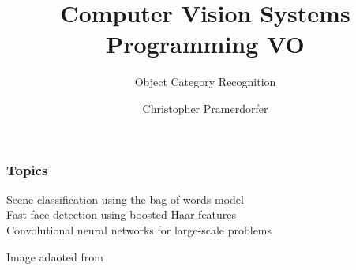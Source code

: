 \documentclass[xetex,professionalfont]{beamer}
\title{Computer Vision Systems Programming VO}
\subtitle{Object Category Recognition}
\author{Christopher Pramerdorfer}
\institute{Computer Vision Lab, Vienna University of Technology}
\begin{document}

\begin{frame}
\maketitle
\end{frame}


\begin{frame}
\frametitle{Topics}

Scene classification using the bag of words model \\
Fast face detection using boosted Haar features \\
Convolutional neural networks for large-scale problems

\bigskip
\begin{center}
    {\centering Image adaoted from \cite{kavukcuoglu2011}}
\end{center}

\end{frame}

\end{document}
